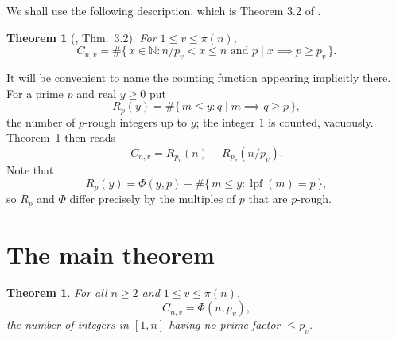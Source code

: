 \documentclass[a4paper,11pt,oneside,reqno]{amsart}
\theoremstyle{definition}
\theoremstyle{remark}
\theoremstyle{plain}
\newtheorem{theorem}[definition]{Theorem}
\newcommand{\NN}{\mathbb{N}}
\newcommand{\lpf}{\operatorname{lpf}}
\begin{document}
We shall use the following description, which is Theorem 3.2 of
\cite{Snellman2000}.

\begin{theorem}[\cite{Snellman2000}, Thm.~3.2]\label{thm:S32}
  For \(1 \le v \le \pi(n)\),
  \begin{equation}\label{eq:S32}
    C_{n,v} = \#\{\,x \in \NN : n/p_v < x \le n \text{ and }
    p \mid x \implies p \ge p_v \,\}.
  \end{equation}
\end{theorem}

It will be convenient to name the counting function appearing implicitly there.
For a prime \(p\) and real \(y \ge 0\) put
\begin{equation}
  R_p(y) = \#\{\,m \le y : q \mid m \implies q \ge p\,\},
\end{equation}
the number of \(p\)-rough integers up to \(y\); the integer \(1\) is counted,
vacuously. Theorem~\ref{thm:S32} then reads
\begin{equation}\label{eq:CasR}
  C_{n,v} = R_{p_v}(n)-R_{p_v}(n/p_v).
\end{equation}
Note that
\begin{equation}\label{eq:RvsPhi}
  R_p(y) = \Phi(y,p)+\#\{\,m \le y : \lpf(m) = p\,\},
\end{equation}
so \(R_p\) and \(\Phi\) differ precisely by the multiples of \(p\) that are
\(p\)-rough.

\section{The main theorem}\label{sec:main}

\begin{theorem}\label{thm:main}
  For all \(n \ge 2\) and \(1 \le v \le \pi(n)\),
  \begin{equation}\label{eq:main}
    C_{n,v} = \Phi(n,p_v),
  \end{equation}
  the number of integers in \([1,n]\) having no prime factor \(\le p_v\).
\end{theorem}
\end{document}
